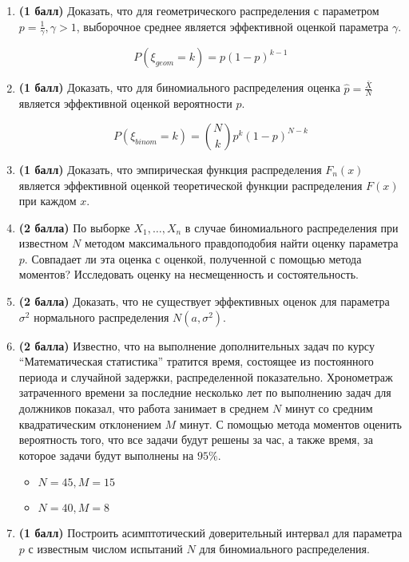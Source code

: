 \documentclass{assignment}
\begin{document}
\begin{enumerate}
    \item \textbf{(1 балл)} Доказать, что для геометрического распределения с параметром $\displaystyle p = \frac{1}{\gamma}, \gamma > 1$, выборочное среднее является эффективной оценкой параметра $\gamma$.

    $$P(\xi_{geom} = k) = p(1 - p)^{k - 1}$$
    
    \item \textbf{(1 балл)} Доказать, что для биномиального распределения оценка $\displaystyle \hat{p} = \frac{\bar{X}}{N}$ является эффективной оценкой вероятности $p$.

    $$P(\xi_{binom} = k) = \binom{N}{k} p^{k}(1 - p)^{N - k}$$

    \item \textbf{(1 балл)} Доказать, что эмпирическая функция распределения $F_n(x)$ является эффективной оценкой теоретической функции распределения $F(x)$ при каждом $x$.

    \item \textbf{(2 балла)} По выборке $X_1, \ldots, X_n$ в случае биномиального распределения при известном $N$ методом максимального правдоподобия найти оценку параметра $p$. Совпадает ли эта оценка с оценкой, полученной с помощью метода моментов? Исследовать оценку на несмещенность и состоятельность.

    \item \textbf{(2 балла)} Доказать, что не существует эффективных оценок для параметра $\sigma^2$ нормального распределения $N(a, \sigma^2)$.

    \item \textbf{(2 балла)} Известно, что на выполнение дополнительных задач по курсу ``Математическая статистика'' тратится время, состоящее из постоянного периода и случайной задержки, распределенной показательно. Хронометраж затраченного времени за последние несколько лет по выполнению задач для должников показал, что работа занимает в среднем $N$ минут со средним квадратическим отклонением $M$ минут. С помощью метода моментов оценить вероятность того, что все задачи будут решены за час, а также время, за которое задачи будут выполнены на $95\%$. 
    \begin{itemize}
        \item $N = 45, M = 15$
        \item $N = 40, M = 8$
    \end{itemize}


    \item \textbf{(1 балл)} Построить асимптотический доверительный интервал для параметра $p$ с известным числом испытаний $N$ для биномиального распределения.


\end{enumerate}
\end{document}
